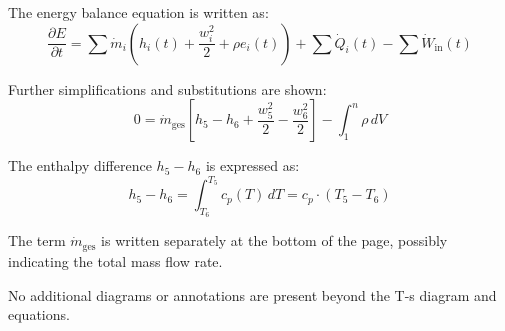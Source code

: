 The energy balance equation is written as:  
\[
\frac{\partial E}{\partial t} = \sum \dot{m}_i \left( h_i(t) + \frac{w_i^2}{2} + \rho e_i(t) \right) + \sum \dot{Q}_i(t) - \sum \dot{W}_\text{in}(t)
\]  

Further simplifications and substitutions are shown:  
\[
0 = \dot{m}_\text{ges} \left[ h_5 - h_6 + \frac{w_5^2}{2} - \frac{w_6^2}{2} \right] - \int_1^n \rho \, dV
\]  

The enthalpy difference \(h_5 - h_6\) is expressed as:  
\[
h_5 - h_6 = \int_{T_6}^{T_5} c_p(T) \, dT = c_p \cdot (T_5 - T_6)
\]  

The term \(\dot{m}_\text{ges}\) is written separately at the bottom of the page, possibly indicating the total mass flow rate.  

No additional diagrams or annotations are present beyond the T-s diagram and equations.